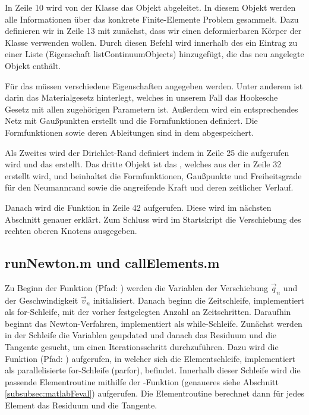 \documentclass[12pt,bibstyle=none,pagenumberinfooter]{ifmdocument}
\begin{document}
In Zeile 10 wird von der Klasse  das Objekt  abgeleitet. In diesem Objekt werden alle Informationen über das konkrete Finite-Elemente Problem gesammelt. Dazu definieren wir in Zeile 13 mit  zunächst, dass wir einen deformierbaren Körper der Klasse  verwenden wollen. Durch diesen Befehl wird innerhalb des  ein Eintrag zu einer Liste (Eigenschaft listContinuumObjects) hinzugefügt, die das neu angelegte Objekt  enthält.

Für das  müssen verschiedene Eigenschaften angegeben werden. Unter anderem ist darin das Materialgesetz hinterlegt, welches in unserem Fall das Hookesche Gesetz mit allen zugehörigen Parametern ist. Außerdem wird ein entsprechendes Netz mit Gaußpunkten erstellt und die Formfunktionen definiert. Die Formfunktionen sowie deren Ableitungen sind in dem  abgespeichert.

Als Zweites wird der Dirichlet-Rand definiert indem in Zeile 25 die  aufgerufen wird und das  erstellt. Das dritte Objekt ist das , welches aus der  in Zeile 32 erstellt wird, und beinhaltet die Formfunktionen, Gaußpunkte und Freiheitsgrade f\"ur den Neumannrand sowie die angreifende Kraft und deren zeitlicher Verlauf.

Danach wird die Funktion  in Zeile 42 aufgerufen. Diese wird im n\"achsten Abschnitt genauer erkl\"art. Zum Schluss wird im Startskript die Verschiebung des rechten oberen Knotens ausgegeben.

\subsection{runNewton.m und callElements.m}
Zu Beginn der Funktion  (Pfad: ) werden die Variablen der Verschiebung $\vec{q}_n$ und der Geschwindigkeit $\vec{v}_n$ initialisiert. Danach beginn die Zeitschleife, implementiert als for-Schleife, mit der vorher festgelegten Anzahl an Zeitschritten. Daraufhin beginnt das Newton-Verfahren, implementiert als while-Schleife. Zun\"achst werden in der Schleife die Variablen geupdated und danach das Residuum und die Tangente gesucht, um einen Iterationsschritt durchzuf\"uhren. Dazu wird die Funktion  (Pfad: ) aufgerufen, in welcher sich die Elementschleife, implementiert als parallelisierte for-Schleife (parfor), befindet. Innerhalb dieser Schleife wird die passende Elementroutine mithilfe der \matlab -Funktion  (genaueres siehe Abschnitt \ref{subsubsec:matlabFeval}) aufgerufen. Die Elementroutine berechnet dann f\"ur jedes Element das Residuum und die Tangente. 
\end{document}
